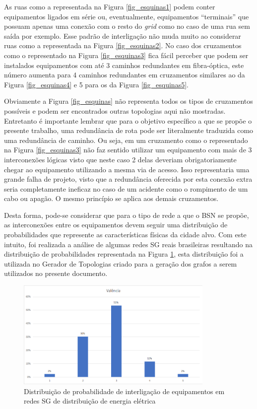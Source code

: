 As ruas como a representada na Figura \ref{fig_esquinas1} podem conter equipamentos ligados em série ou, eventualmente, equipamentos ``terminais'' que possuam apenas uma conexão com o resto do \emph{grid} como no caso de uma rua sem saída por exemplo. Esse padrão de interligação não muda muito ao considerar ruas como a representada na Figura \ref{fig_esquinas2}. No caso dos cruzamentos como o representado na Figura \ref{fig_esquinas3} fica fácil perceber que podem ser instalados equipamentos com até 3 caminhos redundantes em fibra-óptica, este número aumenta para 4 caminhos redundantes em cruzamentos similares ao da Figura \ref{fig_esquinas4} e 5 para os da Figura \ref{fig_esquinas5}. 

Obviamente a Figura \ref{fig_esquinas} não representa todos os tipos de cruzamentos possíveis e podem ser encontrados outras topologias aqui não mostradas. Entretanto é importante lembrar que para o objetivo específico a que se propõe o presente trabalho, uma redundância de rota pode ser literalmente traduzida como uma redundância de caminho. Ou seja, em um cruzamento como o representado na Figura \ref{fig_esquinas3} não faz sentido utilizar um equipamento com mais de 3 interconexões lógicas visto que neste caso 2 delas deveriam obrigatoriamente chegar ao equipamento utilizando a mesma via de acesso. Isso representaria uma grande falha de projeto, visto que a redundância oferecida por esta conexão extra seria completamente ineficaz no caso de um acidente como o rompimento de um cabo ou apagão. O mesmo princípio se aplica aos demais cruzamentos.

Desta forma, pode-se considerar que para o tipo de rede a que o BSN se propõe, as interconexões entre os equipamentos devem seguir uma distribuição de probabilidades que represente as características físicas da cidade alvo. Com este intuito, foi realizada a análise de algumas redes SG reais brasileiras resultando na distribuição de probabilidades representada na Figura \ref{fig_dist_prob}, esta distribuição foi a utilizada no Gerador de Topologias criado para a geração dos grafos a serem utilizados no presente documento.

\begin{figure} [ht]%
	\centering
	\includegraphics[width=0.85\textwidth]{./figuras/Distribuicao-prob.png}
	\caption[Distribuição de probabilidade]{Distribuição de probabilidade de interligação de equipamentos em redes SG de distribuição de energia elétrica}
	\label{fig_dist_prob}
\end{figure}

